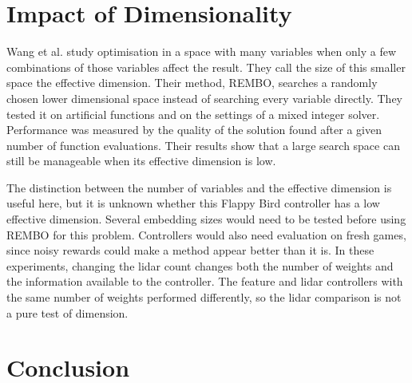 \documentclass[runningheads]{llncs}
\begin{document}
\section{Impact of Dimensionality}
Wang et al. \cite{wang2016rembo} study optimisation in a space with many variables when only a few combinations of those variables affect the result. They call the size of this smaller space the effective dimension. Their method, REMBO, searches a randomly chosen lower dimensional space instead of searching every variable directly. They tested it on artificial functions and on the settings of a mixed integer solver. Performance was measured by the quality of the solution found after a given number of function evaluations. Their results show that a large search space can still be manageable when its effective dimension is low.

The distinction between the number of variables and the effective dimension is useful here, but it is unknown whether this Flappy Bird controller has a low effective dimension. Several embedding sizes would need to be tested before using REMBO for this problem. Controllers would also need evaluation on fresh games, since noisy rewards could make a method appear better than it is. In these experiments, changing the lidar count changes both the number of weights and the information available to the controller. The feature and lidar controllers with the same number of weights performed differently, so the lidar comparison is not a pure test of dimension.

\section{Conclusion}



\end{document}
